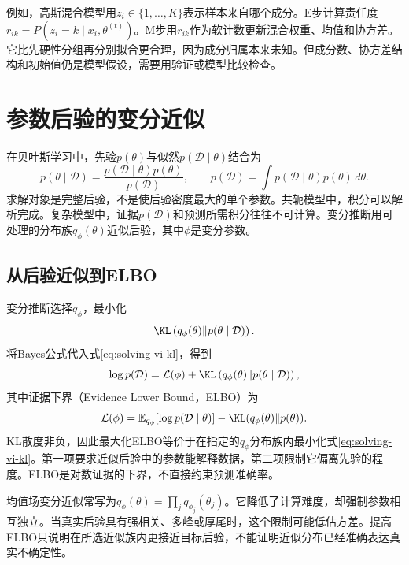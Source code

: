 例如，高斯混合模型用$z_i\in\{1,\ldots,K\}$表示样本来自哪个成分。E步计算责任度$r_{ik}=P(z_i=k\mid x_i,\theta^{(t)})$。M步用$r_{ik}$作为软计数更新混合权重、均值和协方差。它比先硬性分组再分别拟合更合理，因为成分归属本来未知。但成分数、协方差结构和初始值仍是模型假设，需要用验证或模型比较检查。

\section{参数后验的变分近似}

在贝叶斯学习中，先验$p(\theta)$与似然$p(\mathcal D\mid\theta)$结合为
\begin{equation}
 p(\theta\mid\mathcal D)=\frac{p(\mathcal D\mid\theta)p(\theta)}{p(\mathcal D)},
 \qquad p(\mathcal D)=\int p(\mathcal D\mid\theta)p(\theta)\,d\theta.
 \label{eq:solving-posterior}
\end{equation}
求解对象是完整后验，不是使后验密度最大的单个参数。共轭模型中，积分可以解析完成。复杂模型中，证据$p(\mathcal D)$和预测所需积分往往不可计算。变分推断用可处理的分布族$q_\phi(\theta)$近似后验，其中$\phi$是变分参数。

\subsection{从后验近似到ELBO}
变分推断选择$q_\phi$，最小化
\begin{equation}
 \KL\left(q_\phi(\theta)\|p(\theta\mid\mathcal D)\right).
 \label{eq:solving-vi-kl}
\end{equation}
将Bayes公式代入式\eqref{eq:solving-vi-kl}，得到
\begin{equation}
 \log p(\mathcal D)=\mathcal L(\phi)+
 \KL\left(q_\phi(\theta)\|p(\theta\mid\mathcal D)\right),
\end{equation}
其中证据下界（Evidence Lower Bound，ELBO）为
\begin{equation}
 \mathcal L(\phi)=\mathbb E_{q_\phi}[\log p(\mathcal D\mid\theta)]
 -\KL(q_\phi(\theta)\|p(\theta)).
 \label{eq:solving-elbo}
\end{equation}
KL散度非负，因此最大化ELBO等价于在指定的$q_\phi$分布族内最小化式\eqref{eq:solving-vi-kl}。第一项要求近似后验中的参数能解释数据，第二项限制它偏离先验的程度。ELBO是对数证据的下界，不直接约束预测准确率。

均值场变分近似常写为$q_\phi(\theta)=\prod_jq_{\phi_j}(\theta_j)$。它降低了计算难度，却强制参数相互独立。当真实后验具有强相关、多峰或厚尾时，这个限制可能低估方差。提高ELBO只说明在所选近似族内更接近目标后验，不能证明近似分布已经准确表达真实不确定性。


